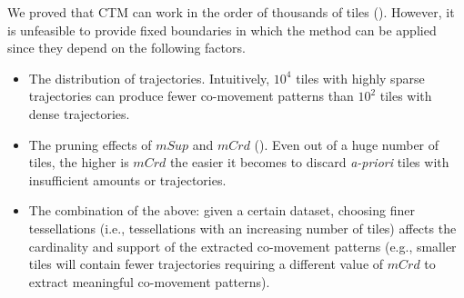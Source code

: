 \documentclass[
]{ceurart}
\begin{document}
We proved that CTM can work in the order of thousands of tiles ().
However, it is unfeasible to provide fixed boundaries in which the method can be applied since they depend on the following factors.
\begin{itemize}
    \item The distribution of trajectories. Intuitively, $10^4$ tiles with highly sparse trajectories can produce fewer co-movement patterns than $10^2$ tiles with dense trajectories. %
    \item The pruning effects of $mSup$ and $mCrd$ (). Even out of a huge number of tiles, the higher is $mCrd$ the easier it becomes to discard \textit{a-priori} tiles with insufficient amounts or trajectories.
    \item The combination of the above: given a certain dataset, choosing finer tessellations (i.e., tessellations with an increasing number of tiles) affects the cardinality and support of the extracted co-movement patterns (e.g., smaller tiles will contain fewer trajectories requiring a different value of $mCrd$ to extract meaningful co-movement patterns).
\end{itemize}
\end{document}
